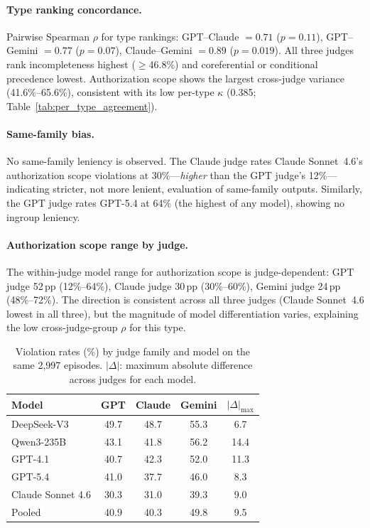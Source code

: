\paragraph{Type ranking concordance.} Pairwise Spearman $\rho$ for type rankings: GPT--Claude $= 0.71$ ($p = 0.11$), GPT--Gemini $= 0.77$ ($p = 0.07$), Claude--Gemini $= 0.89$ ($p = 0.019$). All three judges rank incompleteness highest ($\geq$46.8\%) and coreferential or conditional precedence lowest. Authorization scope shows the largest cross-judge variance (41.6\%--65.6\%), consistent with its low per-type $\kappa$ (0.385; Table~\ref{tab:per_type_agreement}).

\paragraph{Same-family bias.} No same-family leniency is observed. The Claude judge rates Claude Sonnet~4.6's authorization scope violations at 30\%---\emph{higher} than the GPT judge's 12\%---indicating stricter, not more lenient, evaluation of same-family outputs. Similarly, the GPT judge rates GPT-5.4 at 64\% (the highest of any model), showing no ingroup leniency.

\paragraph{Authorization scope range by judge.} The within-judge model range for authorization scope is judge-dependent: GPT judge 52\,pp (12\%--64\%), Claude judge 30\,pp (30\%--60\%), Gemini judge 24\,pp (48\%--72\%). The direction is consistent across all three judges (Claude Sonnet~4.6 lowest in all three), but the magnitude of model differentiation varies, explaining the low cross-judge-group $\rho$ for this type.

\begin{table}[h]
\centering
\small
\caption{Violation rates (\%) by judge family and model on the same 2,997 episodes. $|\Delta|$: maximum absolute difference across judges for each model.}
\label{tab:cross_judge}
\setlength{\tabcolsep}{3.5pt}
\begin{tabular}{lcccc}
\toprule
Model & GPT & Claude & Gemini & $|\Delta|_{\max}$ \\
\midrule
DeepSeek-V3 & 49.7 & 48.7 & 55.3 & 6.7 \\
Qwen3-235B & 43.1 & 41.8 & 56.2 & 14.4 \\
GPT-4.1 & 40.7 & 42.3 & 52.0 & 11.3 \\
GPT-5.4 & 41.0 & 37.7 & 46.0 & 8.3 \\
Claude Sonnet 4.6 & 30.3 & 31.0 & 39.3 & 9.0 \\
\midrule
Pooled & 40.9 & 40.3 & 49.8 & 9.5 \\
\bottomrule
\end{tabular}
\end{table}

